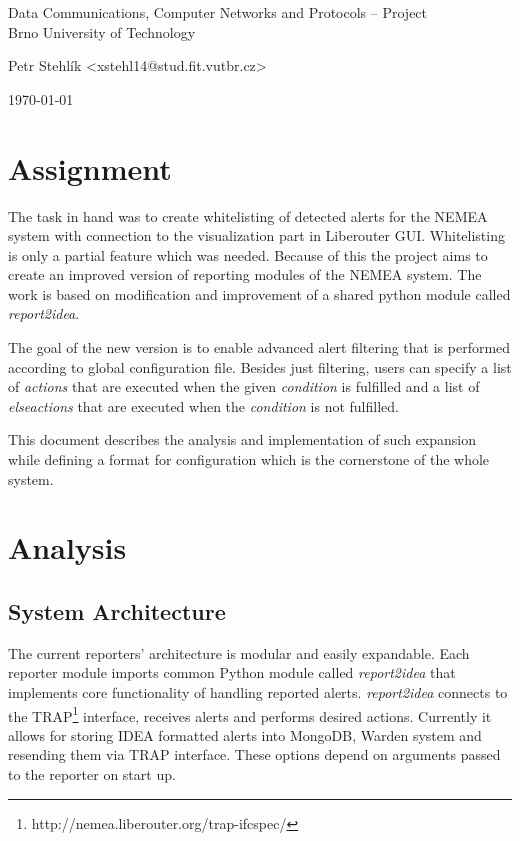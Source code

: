\documentclass[11pt,a4paper]{article}
\begin{document}
\begin{center}
	\LARGE{Data Communications, Computer Networks and Protocols -- Project}\\
	\large{Brno University of Technology}
	\vspace{0.5cm}

	Petr Stehlík <xstehl14@stud.fit.vutbr.cz>

	\vspace{0.2cm}

	\today

\end{center}

\section{Assignment}
The task in hand was to create whitelisting of detected alerts for the NEMEA system with connection to the visualization part in Liberouter GUI. Whitelisting is only a partial feature which was needed. Because of this the project aims to create an improved version of reporting modules of the NEMEA system. The work is based on modification and improvement of a shared python module called \textit{report2idea}.

The goal of the new version is to enable advanced alert filtering that is performed according to global configuration file. Besides just filtering, users can specify a list of \textit{actions} that are executed when the given \textit{condition} is fulfilled and a list of \textit{elseactions} that are executed when the \textit{condition} is not fulfilled.

This document describes the analysis and implementation of such expansion while defining a format for configuration which is the cornerstone of the whole system.

\section{Analysis}
\subsection{System Architecture}

The current reporters' architecture is modular and easily expandable. Each reporter module imports common Python module called \textit{report2idea} that implements core functionality of handling reported alerts. \textit{report2idea} connects to the TRAP\footnote{http://nemea.liberouter.org/trap-ifcspec/} interface, receives alerts and performs desired actions. Currently it allows for storing IDEA formatted alerts into MongoDB, Warden system and resending them via TRAP interface. These options depend on arguments passed to the reporter on start up.
\end{document}
